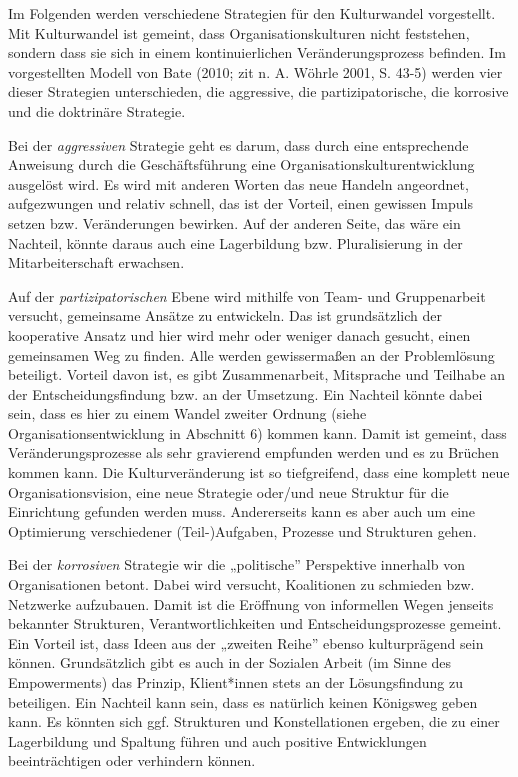 \documentclass[
  letterpaper,
]{book}
\begin{document}
Im Folgenden werden verschiedene Strategien für den Kulturwandel
vorgestellt. Mit Kulturwandel ist gemeint, dass Organisationskulturen
nicht feststehen, sondern dass sie sich in einem kontinuierlichen
Veränderungsprozess befinden. Im vorgestellten Modell von Bate (2010;
zit n. A. Wöhrle 2001, S. 43-5) werden vier dieser Strategien
unterschieden, die aggressive, die partizipatorische, die korrosive und
die doktrinäre Strategie.

Bei der \emph{aggressiven} Strategie geht es darum, dass durch eine
entsprechende Anweisung durch die Geschäftsführung eine
Organisationskulturentwicklung ausgelöst wird. Es wird mit anderen
Worten das neue Handeln angeordnet, aufgezwungen und relativ schnell,
das ist der Vorteil, einen gewissen Impuls setzen bzw. Veränderungen
bewirken. Auf der anderen Seite, das wäre ein Nachteil, könnte daraus
auch eine Lagerbildung bzw. Pluralisierung in der Mitarbeiterschaft
erwachsen.

Auf der \emph{partizipatorischen} Ebene wird mithilfe von Team- und
Gruppenarbeit versucht, gemeinsame Ansätze zu entwickeln. Das ist
grundsätzlich der kooperative Ansatz und hier wird mehr oder weniger
danach gesucht, einen gemeinsamen Weg zu finden. Alle werden
gewissermaßen an der Problemlösung beteiligt. Vorteil davon ist, es gibt
Zusammenarbeit, Mitsprache und Teilhabe an der Entscheidungsfindung bzw.
an der Umsetzung. Ein Nachteil könnte dabei sein, dass es hier zu einem
Wandel zweiter Ordnung (siehe Organisationsentwicklung in Abschnitt 6)
kommen kann. Damit ist gemeint, dass Veränderungsprozesse als sehr
gravierend empfunden werden und es zu Brüchen kommen kann. Die
Kulturveränderung ist so tiefgreifend, dass eine komplett neue
Organisationsvision, eine neue Strategie oder/und neue Struktur für die
Einrichtung gefunden werden muss. Andererseits kann es aber auch um eine
Optimierung verschiedener (Teil-)Aufgaben, Prozesse und Strukturen
gehen.

Bei der \emph{korrosiven} Strategie wir die „politische'' Perspektive
innerhalb von Organisationen betont. Dabei wird versucht, Koalitionen zu
schmieden bzw. Netzwerke aufzubauen. Damit ist die Eröffnung von
informellen Wegen jenseits bekannter Strukturen, Verantwortlichkeiten
und Entscheidungsprozesse gemeint. Ein Vorteil ist, dass Ideen aus der
„zweiten Reihe'' ebenso kulturprägend sein können. Grundsätzlich gibt es
auch in der Sozialen Arbeit (im Sinne des Empowerments) das Prinzip,
Klient*innen stets an der Lösungsfindung zu beteiligen. Ein Nachteil
kann sein, dass es natürlich keinen Königsweg geben kann. Es könnten
sich ggf. Strukturen und Konstellationen ergeben, die zu einer
Lagerbildung und Spaltung führen und auch positive Entwicklungen
beeinträchtigen oder verhindern können.
\end{document}
